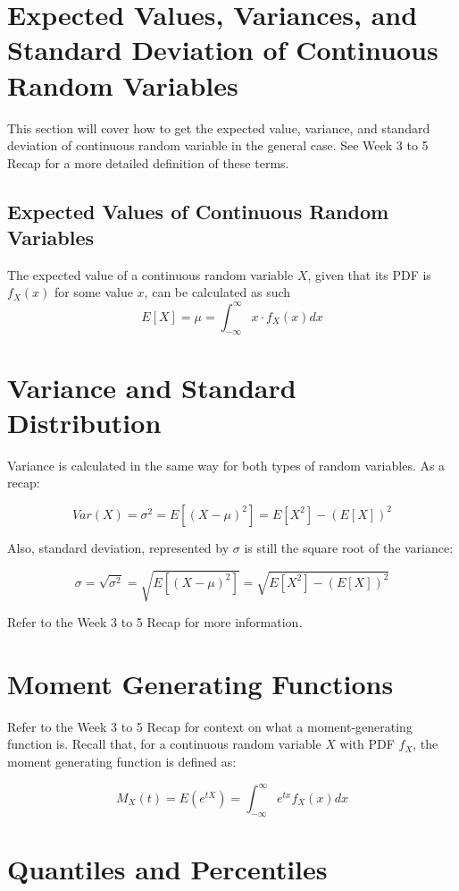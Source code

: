 \documentclass[12pt]{article}
\begin{document}
\section*{Expected Values, Variances, and Standard Deviation of Continuous Random
  Variables}

This section will cover how to get the expected value, variance, and standard
deviation of continuous random variable in the general case. See Week 3
to 5 Recap for a more detailed definition of these terms.

\subsection*{Expected Values of Continuous Random Variables}

The expected value of a continuous random variable $X$, given
that its PDF is $f_X(x)$ for some value $x$, can be calculated as such
\[
	E[X] = \mu = \int_{-\infty}^{\infty} x \cdot f_X(x) dx
\]

\section*{Variance and Standard Distribution}

Variance is calculated in the same way for both types of random variables.
As a recap:

\[
	Var(X) = \sigma^2 = E[(X-\mu)^2] = E[X^2] - (E[X])^2
\]

Also, standard deviation, represented by $\sigma$ is still the square root of
the variance:

\[
	\sigma = \sqrt{\sigma^2} = \sqrt{E[(X-\mu)^2]} = \sqrt{E[X^2] - (E[X])^2}
\]

Refer to the Week 3 to 5 Recap for more information.

\section*{Moment Generating Functions}

Refer to the Week 3 to 5 Recap for context on what a moment-generating
function is. Recall that, for a continuous random variable $X$ with PDF $f_X$,
the moment generating function is defined as:


\[
	M_X(t) = E(e^{tX}) = \int_{-\infty}^{\infty} e^{tx} f_X(x) dx
\]

\section*{Quantiles and Percentiles}
\end{document}
